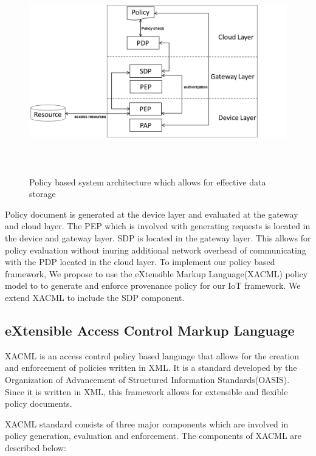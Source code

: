 \begin{figure}[h]
\begin{center}

\includegraphics[height=3.5in]{policy_architecture.png}
\end{center}
\caption{Policy based system architecture which allows for effective data storage}

\end{figure}


Policy document is generated at the device layer and evaluated at the gateway and cloud layer. The PEP which is involved with generating requests is located in the device and gateway layer. SDP is located in the gateway layer. This allows for policy evaluation without inuring additional network overhead of communicating with the PDP located in the cloud layer. To implement our policy based framework, We propose to use the eXtensible Markup Language(XACML) policy model \cite{xacml} to to generate and enforce provenance policy for our IoT framework. We extend XACML to include the SDP component.

\subsection{eXtensible Access Control Markup Language}
 XACML is an access control policy based language that allows for the creation and enforcement of policies written in XML. It is a standard developed by the Organization of Advancement of Structured Information Standards(OASIS). Since it is written in XML, this framework allows for extensible and flexible policy documents. 
 
 XACML standard consists of three major components which are involved in policy generation, evaluation and enforcement. The components of XACML are described below: 
 
